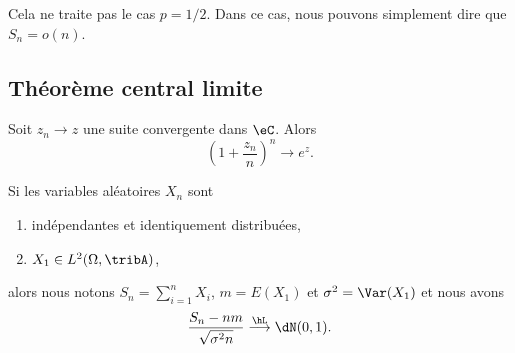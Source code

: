 \begin{remark}
    Cela ne traite pas le cas \( p=1/2\). Dans ce cas, nous pouvons simplement dire que \( S_n=o(n)\).
\end{remark}

\subsection{Théorème central limite}

\begin{lemma}       \label{Lemexpznznsurnton}
    Soit \( z_n\to z\) une suite convergente dans \( \eC\). Alors
    \begin{equation}
        \left( 1+\frac{ z_n }{ n } \right)^n\to e^z.
    \end{equation}
\end{lemma}

\begin{theorem}
    Si les variables aléatoires \( X_n\) sont
    \begin{enumerate}
        \item
            indépendantes et identiquement distribuées,
        \item
            \( X_1\in L^2(\Omega,\tribA)\),
    \end{enumerate}
    alors nous notons \( S_n=\sum_{i=1}^{n}X_i\), \( m=E(X_1)\) et \( \sigma^2=\Var(X_1)\) et nous avons
    \begin{equation}
        \frac{ S_n-nm }{ \sqrt{\sigma^2n} }\stackrel{\hL}{\longrightarrow}\dN(0,1).
    \end{equation}
    
\end{theorem}

